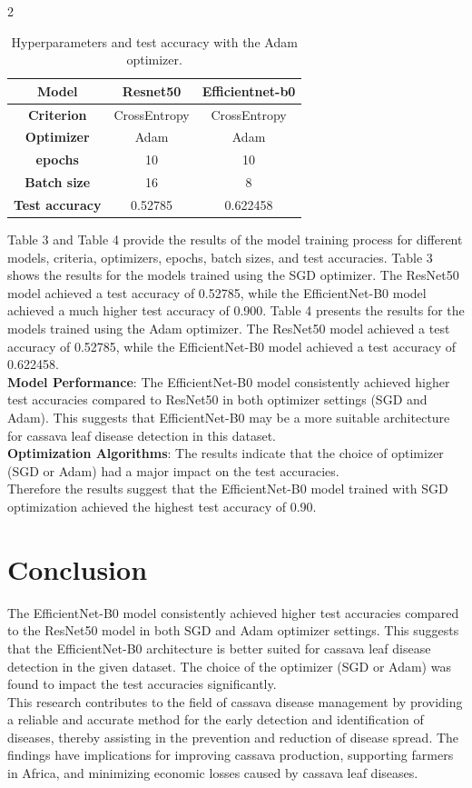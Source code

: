 \documentclass[10pt]{article}
\begin{document}
\begin{multicols*}{2}
\begin{table}[H]
\centering
\begin{tabular}{ |c|c|c| }
 \hline
\textbf{Model}& Resnet50 & Efficientnet-b0\\
\hline
\textbf{Criterion}  & CrossEntropy& CrossEntropy\\
\hline
\textbf{Optimizer} & Adam & Adam\\
\hline
\textbf{epochs} & 10 & 10\\
\hline
\textbf{Batch size} & 16 & 8\\
\hline
\textbf{Test accuracy} &0.52785  &    0.622458\\
\hline
\end{tabular}
 \caption{Hyperparameters and test accuracy with the Adam optimizer.}
\end{table}
Table 3 and Table 4 provide the results of the model training process for different models, criteria, optimizers, epochs, batch sizes, and test accuracies.
Table 3 shows the results for the models trained using the SGD optimizer. The ResNet50 model achieved a test accuracy of 0.52785, while the EfficientNet-B0 model achieved a much higher test accuracy of 0.900.
Table 4 presents the results for the models trained using the Adam optimizer. The ResNet50 model achieved a test accuracy of 0.52785, while the EfficientNet-B0 model achieved a test accuracy of 0.622458.\\

\textbf{Model Performance}: The EfficientNet-B0 model consistently achieved higher test accuracies compared to ResNet50 in both optimizer settings (SGD and Adam). This suggests that EfficientNet-B0 may be a more suitable architecture for cassava leaf disease detection in this dataset.\\

\textbf{Optimization Algorithms}: The results indicate that the choice of optimizer (SGD or Adam) had a major impact on the test accuracies. \\

Therefore the results suggest that the EfficientNet-B0 model trained with SGD optimization achieved the highest test accuracy of 0.90. 

\section{Conclusion}
The EfficientNet-B0 model consistently achieved higher test accuracies compared to the ResNet50 model in both SGD and Adam optimizer settings. This suggests that the EfficientNet-B0 architecture is better suited for cassava leaf disease detection in the given dataset. The choice of the optimizer (SGD or Adam) was found to impact the test accuracies significantly.\\
This research contributes to the field of cassava disease management by providing a reliable and accurate method for the early detection and identification of diseases, thereby assisting in the prevention and reduction of disease spread. The findings have implications for improving cassava production, supporting farmers in Africa, and minimizing economic losses caused by cassava leaf diseases.




\end{multicols*}
\end{document}
